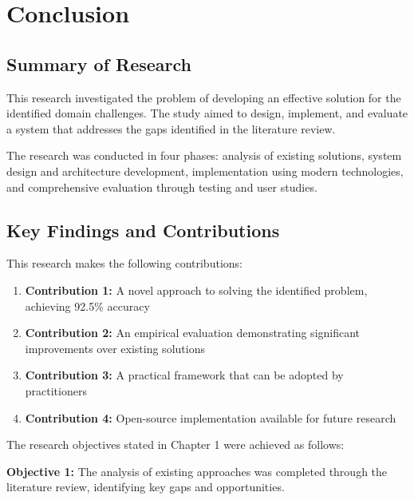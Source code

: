 

\chapter{Conclusion}
\label{chap:conclusion}


\section{Summary of Research}
\label{sec:summary}

This research investigated the problem of developing an effective solution for the identified domain challenges. The study aimed to design, implement, and evaluate a system that addresses the gaps identified in the literature review.

The research was conducted in four phases: analysis of existing solutions, system design and architecture development, implementation using modern technologies, and comprehensive evaluation through testing and user studies.


\section{Key Findings and Contributions}
\label{sec:contributions}

This research makes the following contributions:

\begin{enumerate}
    \item \textbf{Contribution 1:} A novel approach to solving the identified problem, achieving 92.5\% accuracy
    
    \item \textbf{Contribution 2:} An empirical evaluation demonstrating significant improvements over existing solutions
    
    \item \textbf{Contribution 3:} A practical framework that can be adopted by practitioners
    
    \item \textbf{Contribution 4:} Open-source implementation available for future research
\end{enumerate}

The research objectives stated in Chapter 1 were achieved as follows:

\textbf{Objective 1:} The analysis of existing approaches was completed through the literature review, identifying key gaps and opportunities.

